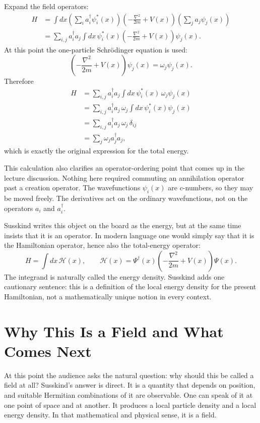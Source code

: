 Expand the field operators:
\begin{align}
H
&=\int dx
\left(\sum_i a_i^\dagger\psi_i^*(x)\right)
\left(-\frac{\nabla^2}{2m}+V(x)\right)
\left(\sum_j a_j\psi_j(x)\right) \\
&=\sum_{i,j} a_i^\dagger a_j
\int dx\,\psi_i^*(x)\left(-\frac{\nabla^2}{2m}+V(x)\right)\psi_j(x).
\end{align}
At this point the one-particle Schr\"odinger equation is used:
\begin{equation}
\left(-\frac{\nabla^2}{2m}+V(x)\right)\psi_j(x)=\omega_j\psi_j(x).
\end{equation}
Therefore
\begin{align}
H
&=\sum_{i,j} a_i^\dagger a_j
\int dx\,\psi_i^*(x)\,\omega_j\psi_j(x) \\
&=\sum_{i,j} a_i^\dagger a_j\,\omega_j
\int dx\,\psi_i^*(x)\psi_j(x) \\
&=\sum_{i,j} a_i^\dagger a_j\,\omega_j\,\delta_{ij} \\
&=\sum_j \omega_j a_j^\dagger a_j,
\end{align}
which is exactly the original expression for the total energy.

This calculation also clarifies an operator-ordering point that comes up in the lecture discussion. Nothing here required commuting an annihilation operator past a creation operator. The wavefunctions $\psi_i(x)$ are c-numbers, so they may be moved freely. The derivatives act on the ordinary wavefunctions, not on the operators $a_i$ and $a_i^\dagger$.

Susskind writes this object on the board as the energy, but at the same time insists that it is an operator. In modern language one would simply say that it is the Hamiltonian operator, hence also the total-energy operator:
\begin{equation}
H=\int dx\,\mathcal{H}(x),
\qquad
\mathcal{H}(x)=\Psi^\dagger(x)\left(-\frac{\nabla^2}{2m}+V(x)\right)\Psi(x).
\end{equation}
The integrand is naturally called the energy density. Susskind adds one cautionary sentence: this is a definition of the local energy density for the present Hamiltonian, not a mathematically unique notion in every context.

\section{Why This Is a Field and What Comes Next}

At this point the audience asks the natural question: why should this be called a field at all? Susskind's answer is direct. It is a quantity that depends on position, and suitable Hermitian combinations of it are observable. One can speak of it at one point of space and at another. It produces a local particle density and a local energy density. In that mathematical and physical sense, it is a field.

